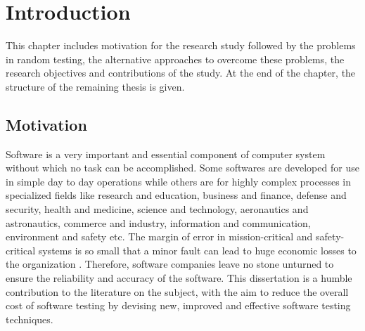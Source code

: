 \chapter{Introduction}
\ifpdf
    \graphicspath{{Introduction/IntroductionFigs/PNG/}{Introduction/IntroductionFigs/PDF/}{Introduction/IntroductionFigs/}}
\else
    \graphicspath{{Introduction/IntroductionFigs/EPS/}{Introduction/IntroductionFigs/}}
\fi

This chapter includes motivation for the research study followed by the problems in random testing, the alternative approaches to overcome these problems, the research objectives and contributions of the study. At the end of the chapter, the structure of the remaining thesis is given.

\section{Motivation}
Software is a very important and essential component of computer system without which no task can be accomplished. Some softwares are developed for use in simple day to day operations while others are for highly complex processes in specialized fields like research and education, business and finance, defense and security, health and medicine, science and technology, aeronautics and astronautics, commerce and industry, information and communication, environment and safety etc. The margin of error in mission-critical and safety-critical systems is so small that a minor fault can lead to huge economic losses to the organization \cite{huang2004securing}. Therefore, software companies leave no stone unturned to ensure the reliability and accuracy of the software. This dissertation is a humble contribution to the literature on the subject, with the aim to reduce the overall cost of software testing by devising new, improved and effective software testing techniques.


